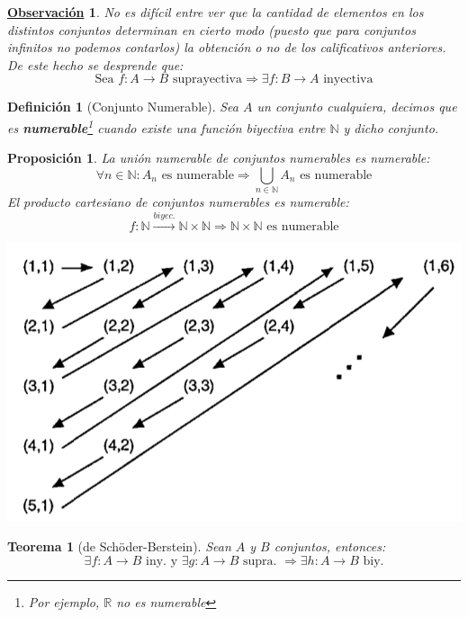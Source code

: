 \documentclass[10pt,a4paper,openright]{book}
\theoremstyle{break}
\newtheorem{defi}{Definición}[chapter]
\newtheorem{theo}{Teorema}[chapter]
\newtheorem{prop}{Proposición}[chapter]
\newtheorem{obs}{\underline{Observación}}[chapter]
\begin{document}
\begin{obs}
No es difícil entre ver que la cantidad de elementos en los distintos conjuntos determinan en cierto modo (puesto que  para conjuntos infinitos no podemos contarlos) la obtención o no de los calificativos anteriores. De este hecho se desprende que:
$$\mbox{Sea }f: A\rightarrow B\mbox{ suprayectiva}\Rightarrow \exists f: B\rightarrow A \mbox{ inyectiva} $$
\end{obs}

\begin{defi}[Conjunto Numerable]
Sea $A$ un conjunto cualquiera, decimos que es \textbf{numerable}\footnote{Por ejemplo, $\mathbb R$ no es numerable} cuando existe una función biyectiva entre $\mathbb N$ y dicho conjunto.
\end{defi}


\begin{prop}
La unión numerable de conjuntos numerables es numerable:
$$\forall n\in \mathbb N : A_n\mbox{ es numerable}\Rightarrow \bigcup_{n\in \mathbb N} A_n\mbox{ es numerable}$$
El producto cartesiano de conjuntos numerables es numerable:
$$f:\mathbb N\stackrel{biyec.}{\rightarrow} \mathbb N \times \mathbb N \Rightarrow \mathbb N \times \mathbb N\mbox{ es numerable}$$
\begin{center}
\includegraphics[scale=0.25]{nxn numerable}
\end{center}
\end{prop}

\begin{theo}[de Schöder-Berstein]
Sean $A$ y $B$ conjuntos, entonces:
$$\exists f: A\rightarrow B \mbox{ iny.}\mbox{ y } \exists g: A\rightarrow B \mbox{ supra. }\Rightarrow \exists h: A\rightarrow B \mbox{ biy.}$$
\end{theo}
\end{document}
